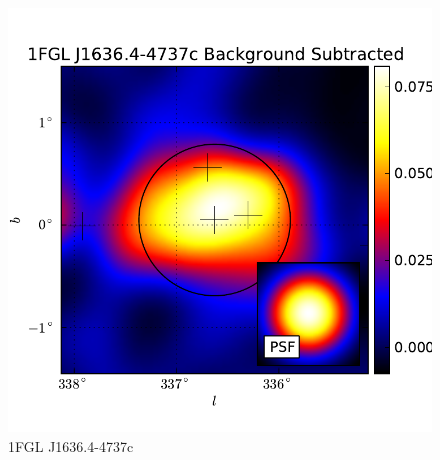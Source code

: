 \documentclass{emulateapj}
\begin{document}
  \begin{figure}
    \begin{center}
      \includegraphics[type=pdf,ext=.pdf,read=.pdf]{source_plots/source_1FGL_J1636.4-4737c}
    \end{center}
    \caption{1FGL J1636.4-4737c}
  \end{figure}
\end{document}
